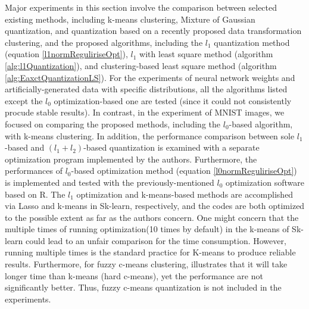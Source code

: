 \documentclass[preprint,10pt]{elsarticle}
\begin{document}
Major experiments in this section involve the comparison between selected existing methods, including k-means clustering, Mixture of Gaussian quantization, and quantization based on a recently proposed data transformation clustering\cite{azimi2017novelClustering}, and the proposed algorithms, including the $l_1$ quantization method (equation \ref{l1normReguliriseOpt}), $l_1$ with least square method (algorithm \ref{alg:l1Quantization}), and clustering-based least square method (algorithm \ref{alg:EaxctQuantizationLS}). For the experiments of neural network weights and artificially-generated data with specific distributions, all the algorithms listed except the $l_0$ optimization-based one are tested (since it could not consistently procude stable results). In contrast, in the experiment of MNIST images, we focused on comparing the proposed methods, including the $l_0$-based algorithm, with k-means clustering. In addition, the performance comparison between sole $l_1$-based and $(l_1 + l_2)$-based quantization is examined with a separate optimization program implemented by the authors. Furthermore, the performances of $l_0$-based optimization method (equation \ref{l0normReguliriseOpt}) is implemented and tested with the previously-mentioned $l_0$ optimization software\cite{l0Learn2018Hazimeh} based on R. The $l_1$ optimization and k-means-based methods are accomplished via Lasso and k-means in Sk-learn\cite{scikit-learn}, respectively, and the codes are both optimized to the possible extent as far as the authors concern. One might concern that the multiple times of running optimization(10 times by default) in the k-means of Sk-learn could lead to an unfair comparison for the time consumption. However, running multiple times is the standard practice for K-means to produce reliable results. Furthermore, for fuzzy c-means clustering, \cite{wen2011hard} illustrates that it will take longer time than k-means (hard c-means), yet the performance are not significantly better. Thus, fuzzy c-means quantization is not included in the experiments. \par
\end{document}
